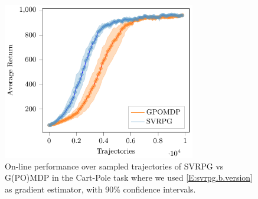 \begin{figure}[h]
	\begin{minipage}[h]{1\textwidth}
		\centering
		\includegraphics[width=0.75\textwidth]{Images/Experiments/cart_pole_GPOMDP_vs_SVRPG_B.pdf}
		\vspace{-0.1in}
		\caption{On-line performance over sampled trajectories of \acs{SVRPG} vs G(PO)MDP in the Cart-Pole task where we used \ref{E:svrpg.b.version} as gradient estimator, with 90\% confidence intervals.}
		\label{fig:cartpole1}
	\end{minipage}
	\vspace{-0.15in}
\end{figure}


